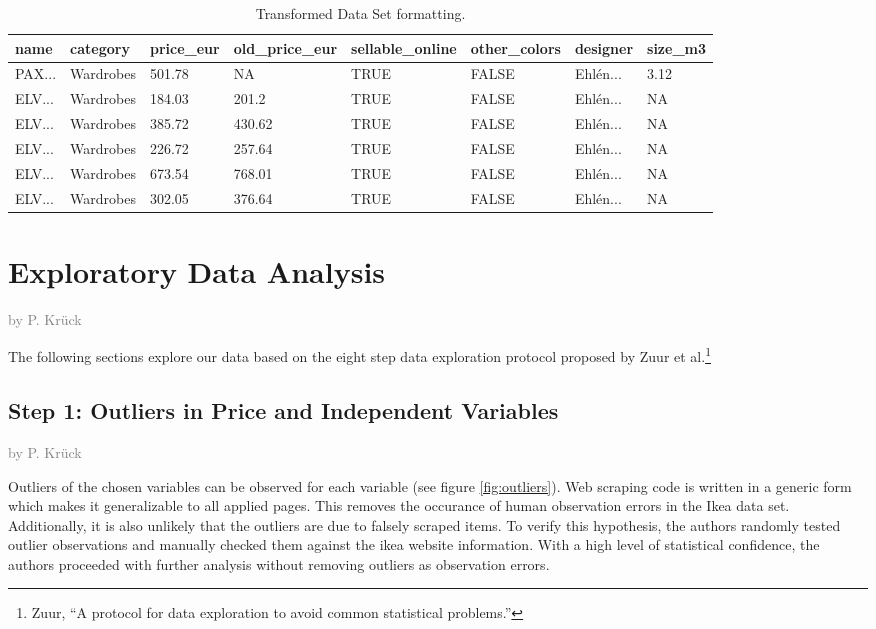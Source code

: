 \documentclass[a4paper, nobind]{templates/ociamthesis}
\begin{document}
\begin{table}

\caption{\label{tab:tidy-ikea}Transformed Data Set formatting.}
\centering
\fontsize{8}{10}\selectfont
\begin{tabular}[t]{l|l|l|l|l|l|l|l}
\hline
name & category & price\_eur & old\_price\_eur & sellable\_online & other\_colors & designer & size\_m3\\
\hline
PAX... & Wardrobes & 501.78 & NA & TRUE & FALSE & Ehlén... & 3.12\\
\hline
ELV... & Wardrobes & 184.03 & 201.2 & TRUE & FALSE & Ehlén... & NA\\
\hline
ELV... & Wardrobes & 385.72 & 430.62 & TRUE & FALSE & Ehlén... & NA\\
\hline
ELV... & Wardrobes & 226.72 & 257.64 & TRUE & FALSE & Ehlén... & NA\\
\hline
ELV... & Wardrobes & 673.54 & 768.01 & TRUE & FALSE & Ehlén... & NA\\
\hline
ELV... & Wardrobes & 302.05 & 376.64 & TRUE & FALSE & Ehlén... & NA\\
\hline
\end{tabular}
\end{table}

\hypertarget{tbd}{%
\section{Exploratory Data Analysis}\label{tbd}}

\textcolor{gray}{by P. Krück}

The following sections explore our data based on the eight step data exploration protocol proposed by Zuur et al.\footnote{Zuur, ``A protocol for data exploration to avoid common statistical problems.''}

\hypertarget{step-1-outliers-in-price-and-independent-variables}{%
\subsection{Step 1: Outliers in Price and Independent Variables}\label{step-1-outliers-in-price-and-independent-variables}}

\textcolor{gray}{by P. Krück}

Outliers of the chosen variables can be observed for each variable (see figure \ref{fig:outliers}).
Web scraping code is written in a generic form which makes it generalizable to all applied pages. This removes the occurance of human observation errors in the Ikea data set. Additionally, it is also unlikely that the outliers are due to falsely scraped items.
To verify this hypothesis, the authors randomly tested outlier observations and manually checked them against the ikea website information. With a high level of statistical confidence, the authors proceeded with further analysis without removing outliers as observation errors.
\end{document}
